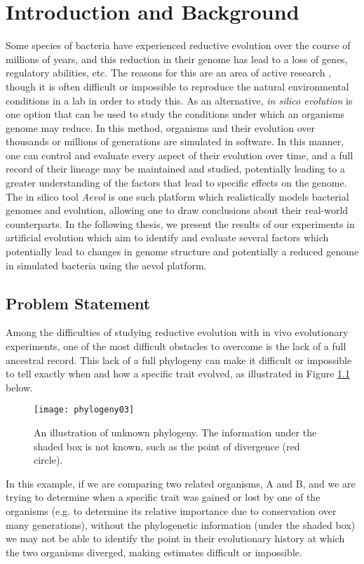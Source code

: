 \chapter{Introduction and Background}\label{ch:intro}
Some species of bacteria have experienced reductive evolution over the course of millions of years, and this reduction in their genome has lead to a loss of genes, regulatory abilities, etc. The reasons for this are an area of active research %
, though it is often difficult or impossible to reproduce the natural environmental conditions in a lab in order to study this. As an alternative, \textit{in silico evolution} is one option that can be used to study the conditions under which an organisms genome may reduce. In this method, organisms and their evolution over thousands or millions of generations are simulated in software. In this manner, one can control and evaluate every aspect of their evolution over time, and a full record of their lineage may be maintained and studied, potentially leading to a greater understanding of the factors that lead to specific effects on the genome. The in silico tool \textit{Aevol} is one such platform which realistically models bacterial genomes and evolution, allowing one to draw conclusions about their real-world counterparts. In the following thesis, we present the results of our experiments in artificial evolution which aim to identify and evaluate several factors which potentially lead to changes in genome structure and potentially a reduced genome in simulated bacteria using the aevol platform. 

\section{Problem Statement}
Among the difficulties of studying reductive evolution with in vivo evolutionary experiments, one of the most difficult obstacles to overcome is the lack of a full ancestral record. This lack of a full phylogeny can make it difficult or impossible to tell exactly when and how a specific trait evolved, as illustrated in Figure \ref{fig:phylogeny03} below. 
\begin{figure}[h]\label{fig:phylogeny03}
\texttt{[image: phylogeny03]}
\centering
\caption{An illustration of unknown phylogeny. The information under the shaded box is not known, such as the point of divergence (red circle).}
\end{figure}
In this example, if we are comparing two related organisms, A and B, and we are trying to determine when a specific trait was gained or lost by one of the organisms (e.g. to determine its relative importance due to conservation over many generations), without the phylogenetic information (under the shaded box) we may not be able to identify the point in their evolutionary history at which the two organisms diverged, making estimates difficult or impossible.

